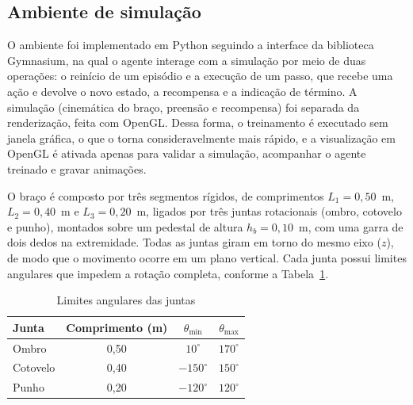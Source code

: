 
\subsection{Ambiente de simulação}

O ambiente foi implementado em Python seguindo a interface da biblioteca Gymnasium, na qual o agente interage com a simulação por meio de duas operações: o reinício de um episódio e a execução de um passo, que recebe uma ação e devolve o novo estado, a recompensa e a indicação de término. A simulação (cinemática do braço, preensão e recompensa) foi separada da renderização, feita com OpenGL. Dessa forma, o treinamento é executado sem janela gráfica, o que o torna consideravelmente mais rápido, e a visualização em OpenGL é ativada apenas para validar a simulação, acompanhar o agente treinado e gravar animações.

O braço é composto por três segmentos rígidos, de comprimentos $L_1 = 0{,}50$~m, $L_2 = 0{,}40$~m e $L_3 = 0{,}20$~m, ligados por três juntas rotacionais (ombro, cotovelo e punho), montados sobre um pedestal de altura $h_b = 0{,}10$~m, com uma garra de dois dedos na extremidade. Todas as juntas giram em torno do mesmo eixo ($z$), de modo que o movimento ocorre em um plano vertical. Cada junta possui limites angulares que impedem a rotação completa, conforme a Tabela~\ref{tab:juntas}.

\begin{table}[htb]
    \centering
    \caption{Limites angulares das juntas}
    \label{tab:juntas}
    \begin{tabular}{lccc}
        \hline
        Junta & Comprimento (m) & $\theta_{\min}$ & $\theta_{\max}$ \\
        \hline
        Ombro    & 0,50 & $10^\circ$   & $170^\circ$ \\
        Cotovelo & 0,40 & $-150^\circ$ & $150^\circ$ \\
        Punho    & 0,20 & $-120^\circ$ & $120^\circ$ \\
        \hline
    \end{tabular}
\end{table}

